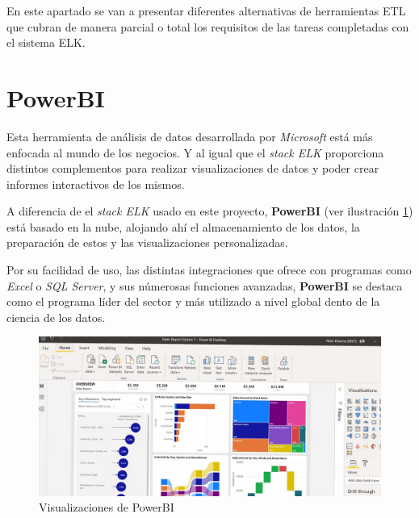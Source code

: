 
En este apartado se van a presentar diferentes alternativas de herramientas ETL que cubran de manera parcial o total los requisitos de las tareas completadas con el sistema ELK.

\section{PowerBI}
Esta herramienta de análisis de datos desarrollada por \textit{Microsoft} está más enfocada al mundo de los negocios\cite{PowerBI}. Y al igual que el \textit{stack ELK} proporciona distintos complementos para realizar visualizaciones de datos y poder crear informes interactivos de los mismos.

A diferencia de el \textit{stack ELK } usado en este proyecto, \textbf{PowerBI}  (ver ilustración  \ref{fig:powerbi}) está basado en la nube, alojando ahí el almacenamiento de los datos, la preparación de estos y las visualizaciones personalizadas.

Por su facilidad de uso, las distintas integraciones que ofrece con programas como \textit{Excel} o \textit{SQL Server}, y sus númerosas funciones avanzadas, \textbf{PowerBI} se destaca como el programa líder del sector y más utilizado a nivel global dento de la ciencia de los datos.

\begin{figure}
    \centering
    \includegraphics[width=1\linewidth]{img/powerbi.jpg}
    \caption{Visualizaciones de PowerBI \cite{PowerBii}}
    \label{fig:powerbi}
\end{figure}

\paragraph{            }
\paragraph{            }

